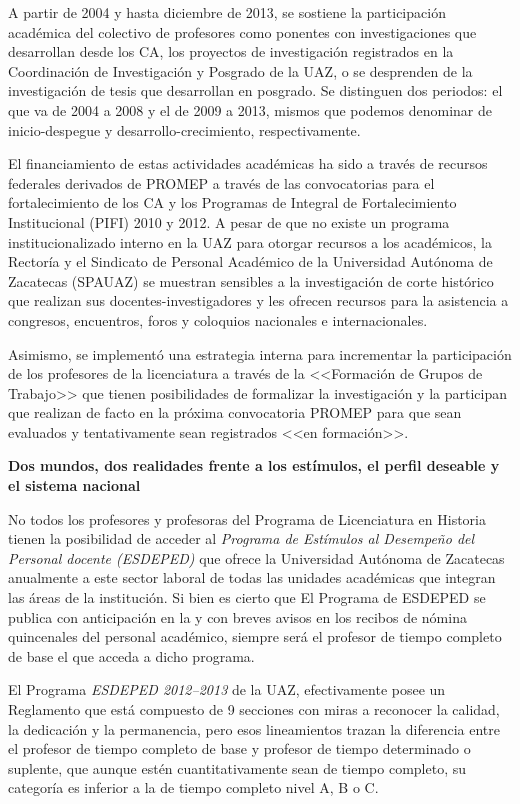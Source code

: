  
A partir de 2004 y hasta diciembre de 2013, se sostiene la participación académica
del colectivo de profesores como ponentes con investigaciones que
desarrollan desde los CA, los proyectos de investigación registrados en la
Coordinación de Investigación y Posgrado de la UAZ, o se desprenden de la
investigación de tesis que desarrollan en posgrado. Se distinguen dos
periodos: el que va de 2004 a 2008 y el de 2009 a 2013, mismos que podemos
denominar de inicio-despegue y desarrollo-crecimiento, respectivamente. 

 
El financiamiento de estas actividades académicas ha sido a través de
recursos federales derivados de PROMEP a través de las convocatorias para
el fortalecimiento de los CA y los Programas de Integral de Fortalecimiento
Institucional (PIFI) 2010 y 2012. A pesar de que no existe un programa
institucionalizado interno en la UAZ para otorgar recursos a los
académicos, la Rectoría  y el Sindicato de Personal Académico de la
Universidad Autónoma de Zacatecas (SPAUAZ) se muestran sensibles a la
investigación de corte histórico que realizan sus docentes-investigadores y
les ofrecen recursos para la asistencia a congresos, encuentros, foros y
coloquios nacionales e internacionales.

 
Asimismo, se implementó una estrategia interna para incrementar la
participación de los profesores de la licenciatura a través de la
<<Formación de Grupos de Trabajo>> que tienen posibilidades de formalizar la
investigación y la participan que realizan de facto en la próxima
convocatoria PROMEP para que sean evaluados y tentativamente sean
registrados <<en formación>>.


\bigskip
\textbf{Dos mundos, dos realidades frente a los estímulos, el perfil
deseable y el sistema nacional}

 
No todos los  profesores y profesoras del Programa de Licenciatura en
Historia tienen la posibilidad de acceder al \textit{Programa de Estímulos
al Desempeño del Personal docente (ESDEPED) }que ofrece la Universidad
Autónoma de Zacatecas anualmente a este sector laboral de todas las
unidades académicas que integran las áreas de la institución. Si bien es
cierto que El Programa de ESDEPED se publica con anticipación en la 
\href{http://www.uaz.edu.mx/}{} y con breves avisos en los recibos de nómina 
quincenales del personal académico, siempre será el profesor de tiempo 
completo de base el que acceda a dicho programa. 

 
El Programa \textit{ESDEPED 2012--2013} de la UAZ, efectivamente posee un
Reglamento que está compuesto de 9 secciones con miras a reconocer la
calidad, la dedicación y la permanencia, pero esos lineamientos trazan la
diferencia entre el profesor de tiempo completo de base y profesor de
tiempo determinado o suplente, que aunque estén cuantitativamente sean de
tiempo completo, su categoría es inferior a la de tiempo completo nivel A,
B o C. 

